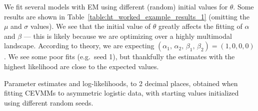 \documentclass[11pt,twoside,openany]{book}
\numberwithin{Theorem}{chapter}
\numberwithin{Definition}{chapter}
\numberwithin{Lemma}{chapter}
\numberwithin{Algorithm}{chapter}
\numberwithin{equation}{chapter}
\begin{document}
We fit several models with EM using different (random) initial values
for $\theta$. Some results are shown in
Table~\ref{table:ht_worked_example_results_1} (omitting the $\mu$ and $\sigma$
values).
We see that the initial value of $\theta$ greatly affects the fitting of $\alpha$ and $\beta$ ---
this is likely because we are optimizing over a highly multimodal landscape.
According to theory, we are expecting $(\alpha_1,\,\alpha_2,\,\beta_1,\,\beta_2) = (1,0,0,0)$.
We see some poor fits (e.g.\ seed 1), but thankfully the estimates
with the highest likelihood are close to the expected values.
\begin{table}[htp]\centering
   \caption{Parameter estimates
  and log-likelihoods, to 2 decimal places, obtained when fitting CEVMMs
to asymmetric logistic data, with starting values initialized using different
random seeds.\label{table:ht_worked_example_results_1} }
\end{table}
\end{document}
